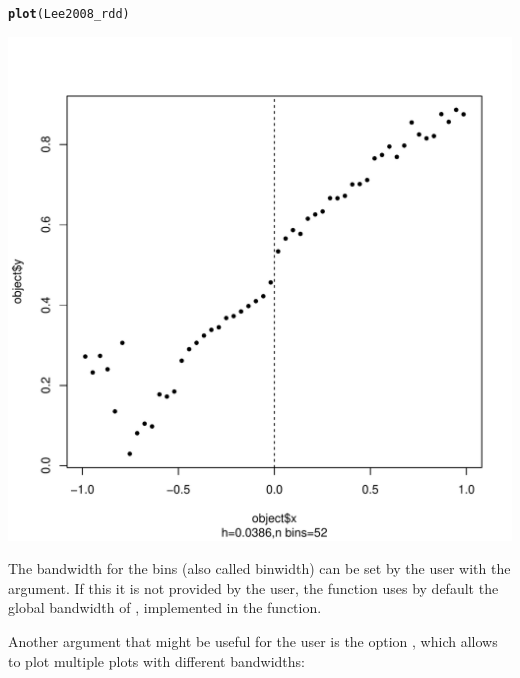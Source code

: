 \documentclass[english,nojss]{jss}\usepackage{graphicx, color}
\makeatletter
\def\maxwidth{ %
  \ifdim\Gin@nat@width>\linewidth
    \linewidth
  \else
    \Gin@nat@width
  \fi
}
\newcommand{\hlfunctioncall}[1]{\textcolor[rgb]{0.501960784313725,0,0.329411764705882}{\textbf{#1}}}%
\newenvironment{kframe}{%
 \def\at@end@of@kframe{}%
 \ifinner\ifhmode%
  \def\at@end@of@kframe{\end{minipage}}%
  \begin{minipage}{\columnwidth}%
 \fi\fi%
 \def\FrameCommand##1{\hskip\@totalleftmargin \hskip-\fboxsep
 \colorbox{shadecolor}{##1}\hskip-\fboxsep
     \hskip-\linewidth \hskip-\@totalleftmargin \hskip\columnwidth}%
 \MakeFramed {\advance\hsize-\width
   \@totalleftmargin\z@ \linewidth\hsize
   \@setminipage}}%
 {\par\unskip\endMakeFramed%
 \at@end@of@kframe}
\newenvironment{knitrout}{}{} %
\makeatother
\begin{document}
\begin{knitrout}
\color{fgcolor}\begin{kframe}
\begin{alltt}
\hlfunctioncall{plot}(Lee2008_rdd)
\end{alltt}


{\ttfamily\noindent\color{warningcolor}{\#\# Warning: font width unknown for character 0x9}}\end{kframe}
\includegraphics[width=\maxwidth]{figure/unnamed-chunk-4} 

\end{knitrout}


The bandwidth for the bins (also called binwidth) can be set by the
user with the  argument. If this it is not provided by the
user, the function uses by default the global bandwidth of \citet{RuppertSheatherEtAl1995},
implemented in the  function. 

Another argument that might be useful for the user is the option ,
which allows to plot multiple plots with different bandwidths:
\end{document}

